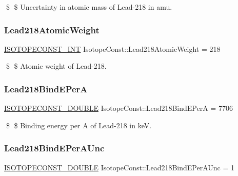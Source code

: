\$ \$ Uncertainty in atomic mass of Lead-\/218 in amu. \mbox{\label{group___isotope_const-_lead-_pb218_ga2145a84447327abc929e3489a86e669a}} 
\subsubsection{\texorpdfstring{Lead218\+Atomic\+Weight}{Lead218AtomicWeight}}
{\footnotesize\ttfamily \mbox{\hyperlink{group___isotope_const-_macros_ga5f18360b3e99483a35c32d789e62621c}{I\+S\+O\+T\+O\+P\+E\+C\+O\+N\+S\+T\+\_\+\+I\+NT}} Isotope\+Const\+::\+Lead218\+Atomic\+Weight = 218}

\$ \$ Atomic weight of Lead-\/218. \mbox{\label{group___isotope_const-_lead-_pb218_ga3ecc08b03f9871cc650037249ba209ae}} 
\subsubsection{\texorpdfstring{Lead218\+Bind\+E\+PerA}{Lead218BindEPerA}}
{\footnotesize\ttfamily \mbox{\hyperlink{group___isotope_const-_macros_ga8f45a7272ce02c0b4c65c44636ed719a}{I\+S\+O\+T\+O\+P\+E\+C\+O\+N\+S\+T\+\_\+\+D\+O\+U\+B\+LE}} Isotope\+Const\+::\+Lead218\+Bind\+E\+PerA = 7706}

\$ \$ Binding energy per A of Lead-\/218 in keV. \mbox{\label{group___isotope_const-_lead-_pb218_gacb9ada6054f1997ce0fa611bc681fc03}} 
\subsubsection{\texorpdfstring{Lead218\+Bind\+E\+Per\+A\+Unc}{Lead218BindEPerAUnc}}
{\footnotesize\ttfamily \mbox{\hyperlink{group___isotope_const-_macros_ga8f45a7272ce02c0b4c65c44636ed719a}{I\+S\+O\+T\+O\+P\+E\+C\+O\+N\+S\+T\+\_\+\+D\+O\+U\+B\+LE}} Isotope\+Const\+::\+Lead218\+Bind\+E\+Per\+A\+Unc = 1}

